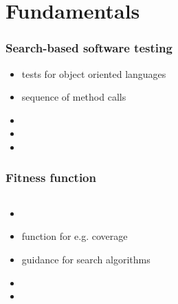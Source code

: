 \section{Fundamentals} 

\begin{frame}
	\frametitle{Search-based software testing}
	
	\begin{itemize}
		\item tests for object oriented languages
		\item sequence of method calls
		\item
		\item
		\item
	\end{itemize}
			
	
\end{frame}

\begin{frame}
	\frametitle{Fitness function}
	
	\begin{columns}[c]
		

		\begin{itemize}
			\item 
			\item function for e.g. coverage
			\item guidance for search algorithms
			\item
			\item
		\end{itemize}
		
		

	\end{columns}
	
\end{frame}

